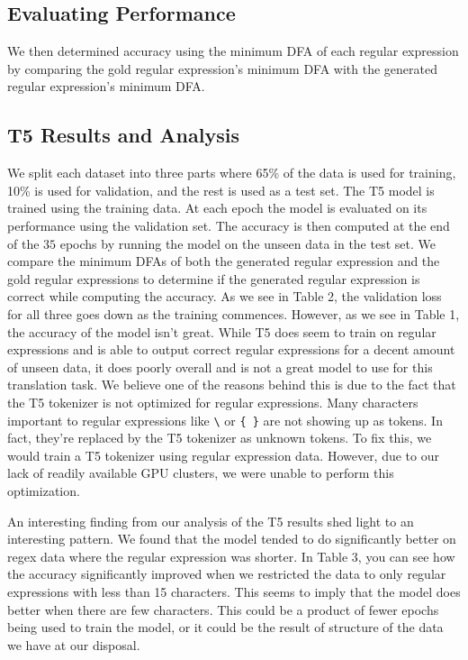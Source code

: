 \documentclass[11pt,a4paper]{article}
\begin{document}
\subsection*{Evaluating Performance}We then determined accuracy using the minimum DFA of each regular expression by comparing the gold regular expression's minimum DFA with the generated regular expression's minimum DFA. 

\subsection*{T5 Results and Analysis}
We split each dataset into three parts where 65\% of the data is used for training, 10\% is used for validation, and the rest is used as a test set. The T5 model is trained using the training data. At each epoch the model is evaluated on its performance using the validation set. The accuracy is then computed at the end of the $35$ epochs by running the model on the unseen data in the test set. We compare the minimum DFAs of both the generated regular expression and the gold regular expressions to determine if the generated regular expression is correct while computing the accuracy. As we see in Table 2, the validation loss for all three goes down as the training commences. However, as we see in Table 1, the accuracy of the model isn't great. While T5 does seem to train on regular expressions and is able to output correct regular expressions for a decent amount of unseen data, it does poorly overall and is not a great model to use for this translation task. We believe one of the reasons behind this is due to the fact that the T5 tokenizer is not optimized for regular expressions. Many characters important to regular expressions like \texttt{\textbackslash} or \texttt{\{ \}} are not showing up as tokens. In fact, they're replaced by the T5 tokenizer as unknown tokens. To fix this, we would train a T5 tokenizer using regular expression data. However, due to our lack of readily available GPU clusters, we were unable to perform this optimization. 

An interesting finding from our analysis of the T5 results shed light to an interesting pattern. We found that the model tended to do significantly better on regex data where the regular expression was shorter. In Table 3, you can see how the accuracy significantly improved when we restricted the data to only regular expressions with less than 15 characters. This seems to imply that the model does better when there are few characters. This could be a product of fewer epochs being used to train the model, or it could be the result of structure of the data we have at our disposal.
\end{document}
